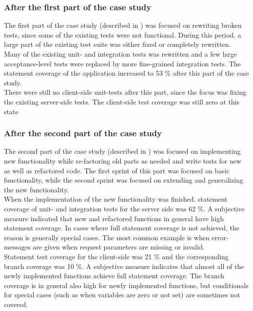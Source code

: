 \subsubsection{After the first part of the case study}

The first part of the case study (described in )
was focused on rewriting broken tests, since some of the existing tests
were not functional. During this period, a large part of the existing
test suite was either fixed or completely rewritten. Many of the
existing unit- and integration tests was rewritten and a few large
acceptance-level tests were replaced by more fine-grained integration
tests. The statement coverage of the application increased to 53 \%
after this part of the case study.\\

There were still no client-side unit-tests after this part, since the
focus was fixing the existing server-side tests. The client-side test
coverage was still zero at this state \\

\subsubsection{After the second part of the case study}
\label{sec:result_coverage_end}

The second part of the case study (described in )
was focused on implementing new functionality while re-factoring old
parts as needed and write tests for new as well as refactored code. The
first sprint of this part was focused on basic functionality, while the
second sprint was focused on extending and generalizing the new
functionality.\\

When the implementation of the new functionality was finished, statement
coverage of unit- and integration tests for the server side was 62 \%. A
subjective measure indicated that new and refactored functions in
general have high statement coverage. In cases where full statement
coverage is not achieved, the reason is generally special cases. The
most common example is when error-messages are given when request
parameters are missing or invalid.\\

Statement test coverage for the client-side was 21 \% and the
corresponding branch coverage was 10 \%. A subjective measure
indicates that almost all of the newly implemented functions achieve
full statement coverage. The branch coverage is in general also high for
newly implemented functions, but conditionals for special cases (such as
when variables are zero or not set) are sometimes not covered.\\

